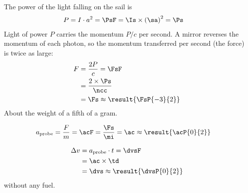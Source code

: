 \begin{abcliste}
\abc The power of the light falling on the sail is
\begin{align}
 P &= I\cdot a^2 = \PsF = \Is\times\left(\sa\right)^2 = \Ps
\end{align}
Light of power $P$ carries the momentum $P/c$ per second. A mirror reverses the momentum of each photon, so the momentum transferred per second (the force) is twice as large:
\begin{align}
 F &= \frac{2P}{c} = \FsF \\
   &= \frac{2\times\Ps}{\ncc} \\
   &= \Fs \approx \result{\FsP{-3}{2}}
\end{align}
About the weight of a fifth of a gram.

\abc
\begin{align}
 a_\text{probe} &= \frac{F}{m} = \acF = \frac{\Fs}{\mi} = \ac \approx \result{\acP{0}{2}}
\end{align}

\abc
\begin{align}
 \Delta v &= a_\text{probe}\cdot t = \dvsF \\
   &= \ac\times\td \\
   &= \dvs \approx \result{\dvsP{0}{2}}
\end{align}
without any fuel.
\end{abcliste}
